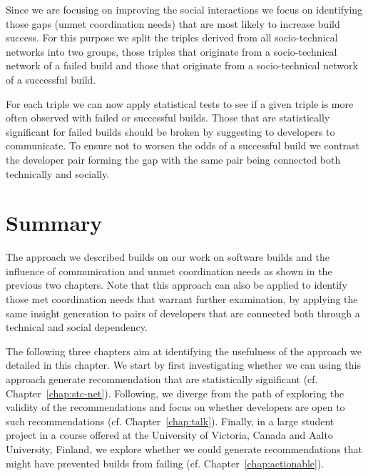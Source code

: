Since we are focusing on improving the social interactions we focus on identifying those gaps (unmet coordination needs) that are most likely to increase build success.
For this purpose we split the triples derived from all socio-technical networks into two groups, those triples that originate from a socio-technical network of a failed build and those that originate from a socio-technical network of a successful build.

For each triple we can now apply statistical tests to see if a given triple is more often observed with failed or successful builds.
Those that are statistically significant for failed builds should be broken by suggesting to developers to communicate.
To ensure not to worsen the odds of a successful build we contrast the developer pair forming the gap with the same pair being connected both technically and socially.

\section{Summary}
The approach we described builds on our work on software builds and the influence of communication and unmet coordination needs as shown in the previous two chapters.
Note that this approach can also be applied to identify those met coordination needs that warrant further examination, by applying the same insight generation to pairs of developers that are connected both through a technical and social dependency.

The following three chapters aim at identifying the usefulness of the approach we detailed in this chapter.
We start by first investigating whether we can using this approach generate recommendation that are statistically significant (cf. Chapter~\ref{chap:stc-net}).
Following, we diverge from the path of exploring the validity of the recommendations and focus on whether developers are open to such recommendations (cf. Chapter~\ref{chap:talk}).
Finally, in a large student project in a course offered at the University of Victoria, Canada and Aalto University, Finland, we explore whether we could generate recommendations that might have prevented builds from failing (cf. Chapter~\ref{chap:actionable}).